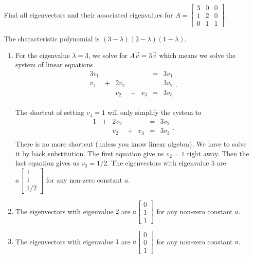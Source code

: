 \documentclass[../main.tex]{subfiles}
\begin{document}
\begin{exercise}
  Find all eigenvectors and their associated eigenvalues for \(A = \begin{bmatrix} 3 & 0 & 0 \\ 1 & 2 & 0 \\ 0 & 1 & 1 \end{bmatrix}\).

  \begin{solution}
    The characteristic polynomial is \((3 - \lambda)(2 - \lambda)(1 - \lambda)\). 
    \begin{enumerate}
      \item For the eigenvalue \(\lambda = 3\), we solve for \(A \vec{v} = 3 \vec{v}\) which means we solve the system of linear equations
        \[
          \begin{array}{rcrcrcr}
            3 v_{1} & &         & &       &=& 3 v_{1} \\
              v_{1} &+& 2 v_{2} & &       &=& 3 v_{2} \\
                    & &   v_{2} &+& v_{3} &=& 3 v_{3} \\
          \end{array}.
        \]
         
        The shortcut of setting \(v_{1} = 1\) will only simplify the system to
        \[
          \begin{array}{rcrcrcr}
                  1 &+& 2 v_{2} & &       &=& 3 v_{2} \\
                    & &   v_{2} &+& v_{3} &=& 3 v_{3} \\
          \end{array}.
        \]
        There is no more shortcut (unless you know linear algebra). We have to solve it by back substitution. The first equation give us \(v_{2} = 1\) right away. Then the last equation gives us \(v_{3} = 1/2\). The eigenvectors with eigenvalue \(3\) are \(a \begin{bmatrix} 1 \\ 1 \\ 1/2 \end{bmatrix}\) for any non-zero constant \(a\).

      \item The eigenvectors with eigenvalue \(2\) are \(a \begin{bmatrix} 0 \\ 1 \\ 1 \end{bmatrix}\) for any non-zero constant \(a\).

      \item The eigenvectors with eigenvalue \(1\) are \(a \begin{bmatrix} 0 \\ 0 \\ 1 \end{bmatrix}\) for any non-zero constant \(a\).
    \end{enumerate}
  \end{solution}
\end{exercise}
\end{document}
